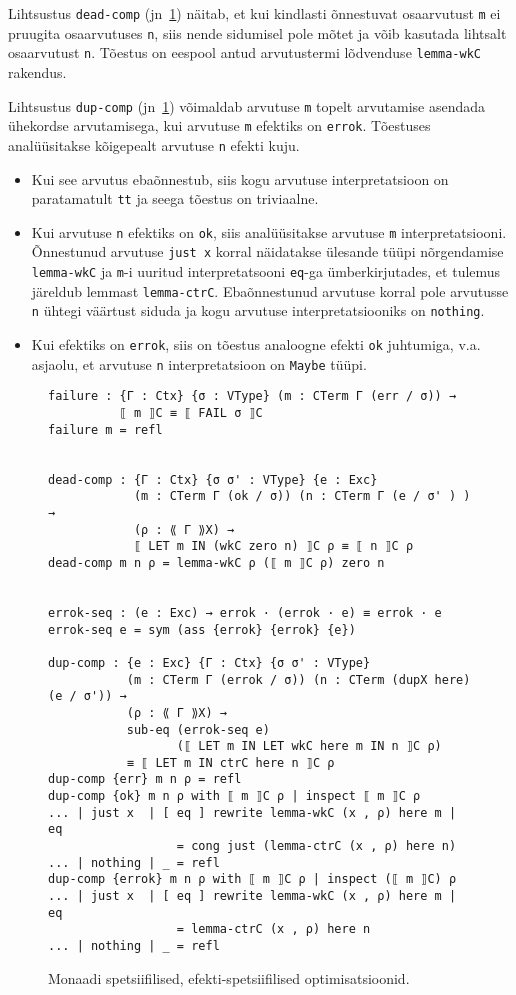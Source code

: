 \documentclass[a4paper,12pt]{article}
\begin{document}
Lihtsustus {\tt dead-comp} (jn~\ref{fig:exc.opt2}) näitab, et kui kindlasti õnnestuvat osaarvutust {\tt m} ei pruugita osaarvutuses {\tt n}, siis nende sidumisel pole mõtet ja võib kasutada lihtsalt osaarvutust {\tt n}. Tõestus on eespool antud arvutustermi lõdvenduse {\tt lemma-wkC} rakendus.

Lihtsustus {\tt dup-comp} (jn~\ref{fig:exc.opt2}) võimaldab arvutuse {\tt m} topelt arvutamise asendada ühekordse arvutamisega, kui arvutuse {\tt m} efektiks on {\tt errok}. Tõestuses analüüsitakse kõigepealt arvutuse {\tt n} efekti kuju.
\begin{itemize}
\item Kui see arvutus ebaõnnestub, siis kogu arvutuse interpretatsioon on paratamatult {\tt tt} ja seega tõestus on triviaalne.
\item Kui arvutuse {\tt n} efektiks on {\tt ok}, siis analüüsitakse arvutuse {\tt m} interpretatsiooni. Õnnestunud arvutuse {\tt just x} korral näidatakse ülesande tüüpi nõrgendamise {\tt lemma-wkC} ja {\tt m}-i uuritud interpretatsooni {\tt eq}-ga ümberkirjutades, et tulemus järeldub lemmast {\tt lemma-ctrC}. Ebaõnnestunud arvutuse korral pole arvutusse {\tt n} ühtegi väärtust siduda ja kogu arvutuse interpretatsiooniks on {\tt nothing}.
\item Kui efektiks on {\tt errok}, siis on tõestus analoogne efekti {\tt ok} juhtumiga, v.a. asjaolu, et arvutuse {\tt n} interpretatsioon on {\tt Maybe} tüüpi.
\end{itemize}

\begin{figure}
  \begin{BVerbatim}
failure : {Γ : Ctx} {σ : VType} (m : CTerm Γ (err / σ)) →
          ⟦ m ⟧C ≡ ⟦ FAIL σ ⟧C
failure m = refl


dead-comp : {Γ : Ctx} {σ σ' : VType} {e : Exc}
            (m : CTerm Γ (ok / σ)) (n : CTerm Γ (e / σ' ) ) →
            (ρ : ⟪ Γ ⟫X) → 
            ⟦ LET m IN (wkC zero n) ⟧C ρ ≡ ⟦ n ⟧C ρ
dead-comp m n ρ = lemma-wkC ρ (⟦ m ⟧C ρ) zero n


errok-seq : (e : Exc) → errok · (errok · e) ≡ errok · e
errok-seq e = sym (ass {errok} {errok} {e})

dup-comp : {e : Exc} {Γ : Ctx} {σ σ' : VType} 
           (m : CTerm Γ (errok / σ)) (n : CTerm (dupX here) (e / σ')) →
           (ρ : ⟪ Γ ⟫X) → 
           sub-eq (errok-seq e)
                  (⟦ LET m IN LET wkC here m IN n ⟧C ρ)
           ≡ ⟦ LET m IN ctrC here n ⟧C ρ
dup-comp {err} m n ρ = refl
dup-comp {ok} m n ρ with ⟦ m ⟧C ρ | inspect ⟦ m ⟧C ρ
... | just x  | [ eq ] rewrite lemma-wkC (x , ρ) here m | eq
                  = cong just (lemma-ctrC (x , ρ) here n)
... | nothing | _ = refl
dup-comp {errok} m n ρ with ⟦ m ⟧C ρ | inspect (⟦ m ⟧C) ρ 
... | just x  | [ eq ] rewrite lemma-wkC (x , ρ) here m | eq
                  = lemma-ctrC (x , ρ) here n
... | nothing | _ = refl
  \end{BVerbatim}
  \caption{Monaadi spetsiifilised, efekti-spetsiifilised optimisatsioonid.}
  \label{fig:exc.opt2}
\end{figure}
\end{document}
